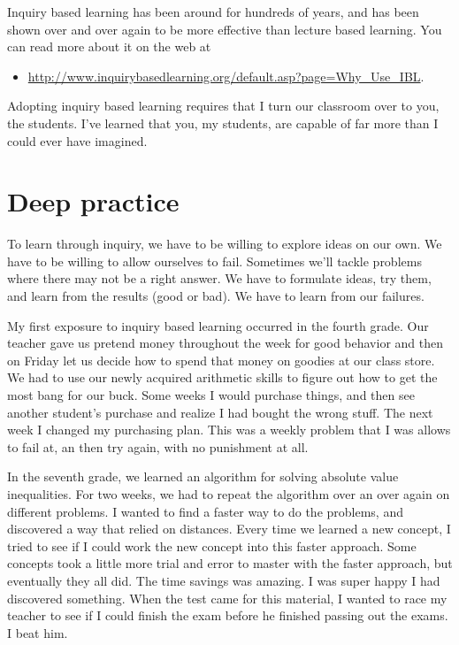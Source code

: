\documentclass[letterpaper,oneside]{book}%
\theoremstyle{plain}
\theoremstyle{box}
\theoremstyle{problem}
\begin{document}
Inquiry based learning has been around for hundreds of years, and has been shown over and over again to be more effective than lecture based learning.  You can read more about it on the web at
\begin{itemize}
 \item \href{http://www.inquirybasedlearning.org/default.asp?page=Why\_Use\_IBL}{http://www.inquirybasedlearning.org/default.asp?page=Why\_Use\_IBL}.
\end{itemize}
Adopting inquiry based learning requires that I turn our classroom over to you, the students. I've learned that you, my students, are capable of far more than I could ever have imagined.


\section*{Deep practice}

To learn through inquiry, we have to be willing to explore ideas on our own. We have to be willing to allow ourselves to fail. Sometimes we'll tackle problems where there may not be a right answer. We have to formulate ideas, try them, and learn from the results (good or bad).  We have to learn from our failures. 

My first exposure to inquiry based learning occurred in the fourth grade. Our teacher gave us pretend money throughout the week for good behavior and then on Friday let us decide how to spend that money on goodies at our class store. We had to use our newly acquired arithmetic skills to figure out how to get the most bang for our buck. Some weeks I would purchase things, and then see another student's purchase and realize I had bought the wrong stuff. The next week I changed my purchasing plan. This was a weekly problem that I was allows to fail at, an then try again, with no punishment at all.

In the seventh grade, we learned an algorithm for solving absolute value inequalities. For two weeks, we had to repeat the algorithm over an over again on different problems. I wanted to find a faster way to do the problems, and discovered a way that relied on distances. Every time we learned a new concept, I tried to see if I could work the new concept into this faster approach. Some concepts took a little more trial and error to master with the faster approach, but eventually they all did.  The time savings was amazing. I was super happy I had discovered something. When the test came for this material, I wanted to race my teacher to see if I could finish the exam before he finished passing out the exams.  I beat him.
\end{document}
